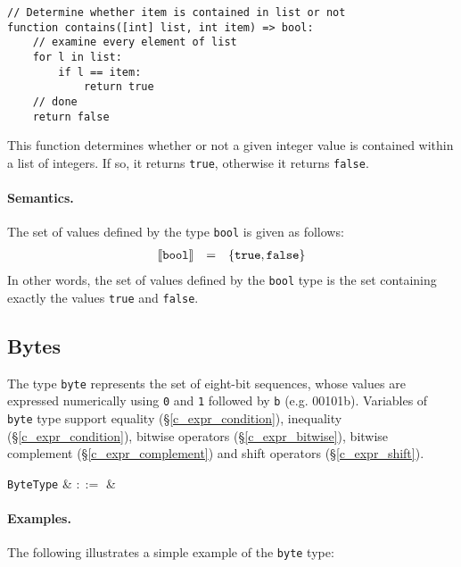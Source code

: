 \begin{lstlisting}
// Determine whether item is contained in list or not
function contains([int] list, int item) => bool:
    // examine every element of list
    for l in list:
        if l == item:
            return true
    // done
    return false
\end{lstlisting}
This function determines whether or not a given integer value is contained within a list of integers.  If so, it returns \lstinline{true}, otherwise it returns \lstinline{false}.

\paragraph{Semantics.}  The set of values defined by the type \lstinline{bool} is given as follows:
\begin{displaymath}
\begin{array}{rcl}
{\tt\llbracket bool\rrbracket} & = & {\tt\{ true, false\}}\\
\end{array}
\end{displaymath}
In other words, the set of values defined by the \lstinline{bool} type is the set containing exactly the values \lstinline{true} and \lstinline{false}.


\subsection{Bytes}
\label{c_types_byte}

The type \lstinline{byte} represents the set of eight-bit sequences, whose values are expressed numerically using \lstinline{0} and \lstinline{1} followed by \lstinline{b} (e.g. 00101b).  Variables of \lstinline{byte} type support equality (\S\ref{c_expr_condition}), inequality (\S\ref{c_expr_condition}), bitwise operators (\S\ref{c_expr_bitwise}), bitwise complement (\S\ref{c_expr_complement}) and shift operators (\S\ref{c_expr_shift}).

\begin{syntax}
 \verb+ByteType+ & $::=$ & \\
\end{syntax}

\paragraph{Examples.}  The following illustrates a simple example of the \lstinline{byte} type:

